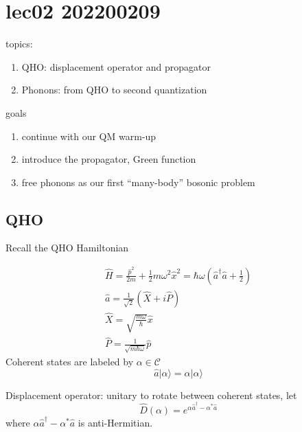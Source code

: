 \chapter{lec02 202200209}

topics:

\begin{enumerate}
    \item QHO: displacement operator and propagator
    \item Phonons: from QHO to second quantization
\end{enumerate}

goals

\begin{enumerate}
    \item continue with our QM warm-up
    \item introduce the propagator, Green function
    \item free phonons as our first ``many-body'' bosonic problem
\end{enumerate}

\section{QHO}

Recall the QHO Hamiltonian

\begin{gather*}
    \hat{H}=\frac{\hat{p}^2}{2m}+\frac{1}{2}m\omega ^2\hat{x}^2=\hbar \omega \left( \hat{a}^{\dagger}\hat{a}+\frac{1}{2} \right) \\
    \hat{a}=\frac{1}{\sqrt{2}}\left( \hat{X}+i\hat{P} \right) \\
    \hat{X}=\sqrt{\frac{m\omega}{\hbar}}\hat{x}\\
    \hat{P}=\frac{1}{\sqrt{m\hbar \omega}}\hat{p}
\end{gather*}
Coherent states are labeled by $\alpha\in\mathcal{C}$
\[ \hat{a}|\alpha \rangle =\alpha |\alpha \rangle \]

Displacement operator: unitary to rotate between coherent states, let
\[ \hat{D}\left( \alpha \right) =e^{ \alpha \hat{a}^{\dagger}-\alpha ^*\hat{a} } \]
where $\alpha \hat{a}^{\dagger}-\alpha ^*\hat{a}$ is anti-Hermitian.

